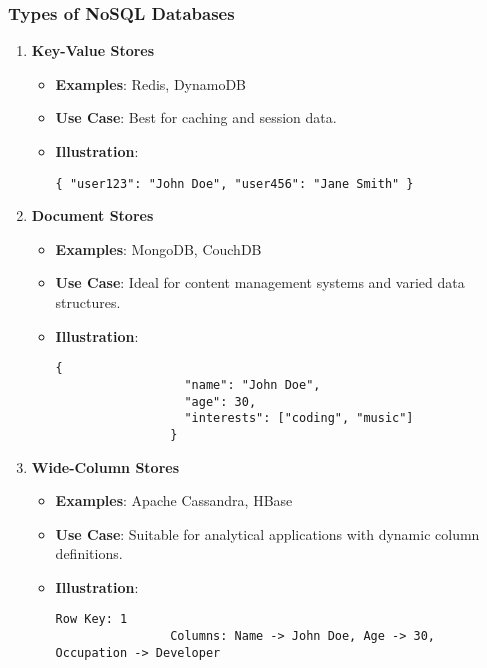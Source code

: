 \documentclass[aspectratio=169]{beamer}
\begin{document}
\begin{frame}[fragile]
    \frametitle{Types of NoSQL Databases}
    \begin{enumerate}
        \item \textbf{Key-Value Stores}
            \begin{itemize}
                \item \textbf{Examples}: Redis, DynamoDB
                \item \textbf{Use Case}: Best for caching and session data.
                \item \textbf{Illustration}:
                \begin{lstlisting}[basicstyle=\small]
                { "user123": "John Doe", "user456": "Jane Smith" }
                \end{lstlisting}
            \end{itemize}
        
        \item \textbf{Document Stores}
            \begin{itemize}
                \item \textbf{Examples}: MongoDB, CouchDB
                \item \textbf{Use Case}: Ideal for content management systems and varied data structures.
                \item \textbf{Illustration}:
                \begin{lstlisting}[basicstyle=\small]
                {
                  "name": "John Doe",
                  "age": 30,
                  "interests": ["coding", "music"]
                }
                \end{lstlisting}
            \end{itemize}
        
        \item \textbf{Wide-Column Stores}
            \begin{itemize}
                \item \textbf{Examples}: Apache Cassandra, HBase
                \item \textbf{Use Case}: Suitable for analytical applications with dynamic column definitions.
                \item \textbf{Illustration}:
                \begin{lstlisting}[basicstyle=\small]
                Row Key: 1
                Columns: Name -> John Doe, Age -> 30, Occupation -> Developer
                \end{lstlisting}
            \end{itemize}
        

\end{enumerate}
\end{frame}
\end{document}
